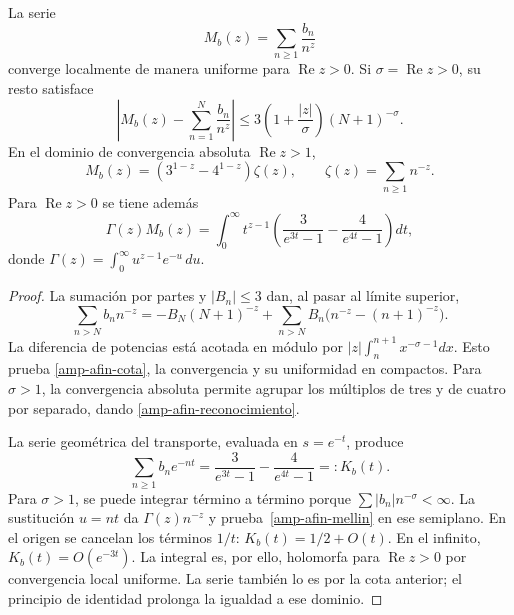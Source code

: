 \begin{theorem}
\label{amp-afin-thm-momentos}
La serie
\begin{equation}
 M_b(z)=\sum_{n\geq1}\frac{b_n}{n^z}
 \label{amp-afin-momento}
\end{equation}
converge localmente de manera uniforme para $\operatorname{Re}z>0$.
Si $\sigma=\operatorname{Re}z>0$, su resto satisface
\begin{equation}
 \left|M_b(z)-\sum_{n=1}^{N}\frac{b_n}{n^z}\right|
 \leq3\left(1+\frac{|z|}{\sigma}\right)(N+1)^{-\sigma}.
 \label{amp-afin-cota}
\end{equation}
En el dominio de convergencia absoluta $\operatorname{Re}z>1$,
\begin{equation}
 M_b(z)=(3^{1-z}-4^{1-z})\zeta(z),\qquad
 \zeta(z)=\sum_{n\geq1}n^{-z}.
 \label{amp-afin-reconocimiento}
\end{equation}
Para $\operatorname{Re}z>0$ se tiene además
\begin{equation}
 \Gamma(z)M_b(z)=
 \int_0^\infty t^{z-1}
 \left(\frac3{e^{3t}-1}-\frac4{e^{4t}-1}\right)dt,
 \label{amp-afin-mellin}
\end{equation}
donde $\Gamma(z)=\int_0^\infty u^{z-1}e^{-u}\,du$.
\end{theorem}
\begin{proof}
La sumación por partes y $|B_n|\leq3$ dan, al pasar al límite superior,
\[
 \sum_{n>N}b_n n^{-z}
 =-B_N(N+1)^{-z}
   +\sum_{n>N}B_n\bigl(n^{-z}-(n+1)^{-z}\bigr).
\]
La diferencia de potencias está acotada en módulo por
$|z|\int_n^{n+1}x^{-\sigma-1}dx$. Esto prueba
\eqref{amp-afin-cota}, la convergencia y su uniformidad en compactos.
Para $\sigma>1$, la convergencia absoluta permite agrupar
los múltiplos de tres y de cuatro por separado, dando
\eqref{amp-afin-reconocimiento}.

La serie geométrica del transporte, evaluada en $s=e^{-t}$, produce
\[
 \sum_{n\geq1}b_n e^{-nt}
 =\frac3{e^{3t}-1}-\frac4{e^{4t}-1}=:K_b(t).
\]
Para $\sigma>1$, se puede integrar término a término porque
$\sum|b_n|n^{-\sigma}<\infty$. La sustitución $u=nt$ da
$\Gamma(z)n^{-z}$ y prueba~\eqref{amp-afin-mellin} en ese semiplano.
En el origen se cancelan los términos $1/t$:
$K_b(t)=1/2+O(t)$. En el infinito, $K_b(t)=O(e^{-3t})$.
La integral es, por ello, holomorfa para $\operatorname{Re}z>0$
por convergencia local uniforme. La serie también lo es por la cota
anterior; el principio de identidad prolonga la igualdad a ese dominio.
\end{proof}

